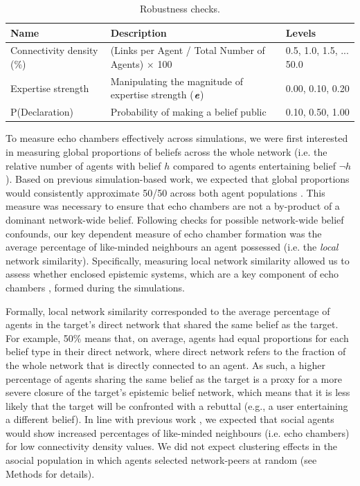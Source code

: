 \documentclass[fleqn,10pt]{wlscirep}
\begin{document}
\begin{table}[ht]
\label{tab:robustness_checks}
\centering
\begin{tabular}{|l|l|l|}
\hline
Name & Description & Levels\\
\hline
Connectivity density (\%) & (Links per Agent / Total Number of Agents) \(\times\) 100 & 0.5, 1.0, 1.5, ... 50.0\\
Expertise strength & Manipulating the magnitude of expertise strength (\(\textbf{\textit{e}}\)) & 0.00, 0.10, 0.20\\
P(Declaration) & Probability of making a belief public & 0.10, 0.50, 1.00\\
\hline
\end{tabular}
\caption{\label{tab:t1}Robustness checks.}
\end{table}


To measure echo chambers effectively across simulations, we were first interested in measuring global proportions of beliefs across the whole network (i.e. the relative number of agents with belief \(h\) compared to agents entertaining belief \(\neg h\)). Based on previous simulation-based work, we expected that global proportions would consistently approximate 50/50 across both agent populations \cite{pilditch2017opinion}. This measure was necessary to ensure that echo chambers are not a by-product of a dominant network-wide belief. Following checks for possible network-wide belief confounds, our key dependent measure of echo chamber formation was the average percentage of like-minded neighbours an agent possessed (i.e. the \textit{local} network similarity). Specifically, measuring local network similarity allowed us to assess whether enclosed epistemic systems, which are a key component of echo chambers \cite{madsen2018large}, formed during the simulations.


Formally, local network similarity corresponded to the average percentage of agents in the target's direct network that shared the same belief as the target. For example, 50\% means that, on average, agents had equal proportions for each belief type in their direct network, where direct network refers to the fraction of the whole network that is directly connected to an agent. As such, a higher percentage of agents sharing the same belief as the target is a proxy for a more severe closure of the target's epistemic belief network, which means that it is less likely that the target will be confronted with a rebuttal (e.g., a user entertaining a different belief). In line with previous work \cite{pilditch2017opinion}, we expected that social agents would show increased percentages of like-minded neighbours (i.e. echo chambers) for low connectivity density values. We did not expect clustering effects in the asocial population in which agents selected network-peers at random (see Methods for details).
\end{document}
